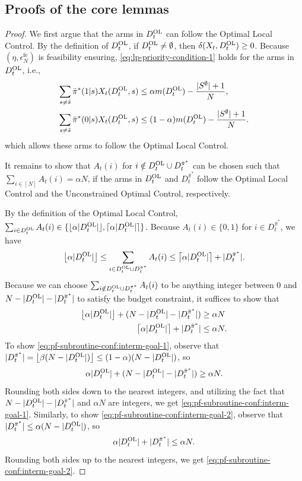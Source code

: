 \documentclass[11pt,letterpaper]{article}
\theoremstyle{plain}
\theoremstyle{definition}
\theoremstyle{remark}
\newcommand{\ceil}[1]{\left\lceil#1\right\rceil}
\newcommand{\floor}[1]{\left\lfloor#1\right\rfloor}
\newcommand{\sumN}{\sum_{i\in[N]}}
\newcommand{\btotal}{\alpha N}
\newcommand{\pibar}{{\sysbar{\pi}}}
\newcommand{\pibs}{{\pibar^*}}
\newcommand{\sysbar}[1]{\bar{#1}}
\newcommand{\sempty}{S^{\emptyset}}
\newcommand{\errfe}{\epsilon_N^{\text{fe}}}
\newcommand{\Da}{D^{\pibs}}
\newcommand{\Db}{D^{\textup{OL}}}
\newcommand{\sneu}{\tilde{s}}
\newcommand{\slk}{\delta}
\begin{document}
\subsection{Proofs of the core lemmas}
\label{sec:two-set:pf-major-lemmas}

\subroutineconformity*

\begin{proof}%
    We first argue that the arms in $\Db_t$ can follow the Optimal Local Control. 
    By the definition of $\Db_t$, if $\Db_t \neq \emptyset$, then $\slk(X_t, \Db_t) \geq 0$. 
    Because $(\eta, \errfe)$ is feasibility ensuring, \eqref{eq:lp-priority-condition-1} holds for the arms in $\Db_t$, i.e., 
    \begin{align}
        \label{eq:two-set:db-condition-1}
        \sum_{s\neq \sneu} \pibs(1|s) X_t(\Db_t, s) &\leq  \alpha m(\Db_t) - \frac{|\sempty|+1}{N}, \\
        \label{eq:two-set:db-condition-2}
         \sum_{s\neq \sneu} \pibs(0|s) X_t(\Db_t, s) &\leq (1-\alpha)m(\Db_t) - \frac{|\sempty|+1}{N}. 
    \end{align}
    which allows these arms to follow the Optimal Local Control. 
    
    It remains to show that $A_t(i)$ for $i\notin \Db_t \cup \Da_t$ can be chosen such that $\sumN A_t(i) = \btotal$, if the arms in $\Db_t$ and $\Da_t$ follow the Optimal Local Control and the Unconstrained Optimal Control, respectively. 


    By the definition of the Optimal Local Control, $\sum_{i\in \Db_t} A_t(i) \in \{\lfloor\alpha |\Db_t|\rfloor, \lceil\alpha |\Db_t|\rceil\}$. 
    Because $A_t(i)\in \{0,1\}$ for $i\in \Da_t$, we have
    \[
        \floor{\alpha |\Db_t|} \leq \sum_{i\in \Db_t\cup\Da_t} A_t(i)\leq \ceil{\alpha |\Db_t|} + |\Da_t|.
    \]
    Because we can choose $\sum_{i\notin \Db_t\cup\Da_t} A_t(i)$ to be anything integer between $0$ and $N - |\Db_t| - |\Da_t|$ to satisfy the budget constraint, it suffices to show that
    \begin{align}
        \label{eq:pf-subroutine-conf:interm-goal-1}
        \floor{\alpha |\Db_t|} + (N - |\Db_t| - |\Da_t|) &\geq \btotal    \\
        \label{eq:pf-subroutine-conf:interm-goal-2}
        \ceil{\alpha |\Db_t|} + |\Da_t| &\leq \btotal. 
    \end{align}
    To show \eqref{eq:pf-subroutine-conf:interm-goal-1}, observe that $|\Da_t| = \big\lfloor \beta (N -|\Db_{t}|)\big\rfloor \leq (1-\alpha)(N - |\Db_t|)$, so 
    \begin{equation*}
        \alpha |\Db_t| + (N - |\Db_t| - |\Da_t|)  \geq \alpha N.
    \end{equation*}
    Rounding both sides down to the nearest integers, and utilizing the fact that $N - |\Db_t| - |\Da_t|$ and $\alpha N$ are integers, we get \eqref{eq:pf-subroutine-conf:interm-goal-1}. Similarly, to show \eqref{eq:pf-subroutine-conf:interm-goal-2}, observe that $|\Da_t| \leq \alpha (N - |\Db_t|)$, so 
    \[
        \alpha |\Db_t| + |\Da_t| \leq \alpha N.
    \]
    Rounding both sides up to the nearest integers, we get  \eqref{eq:pf-subroutine-conf:interm-goal-2}. 
\end{proof}
\end{document}
